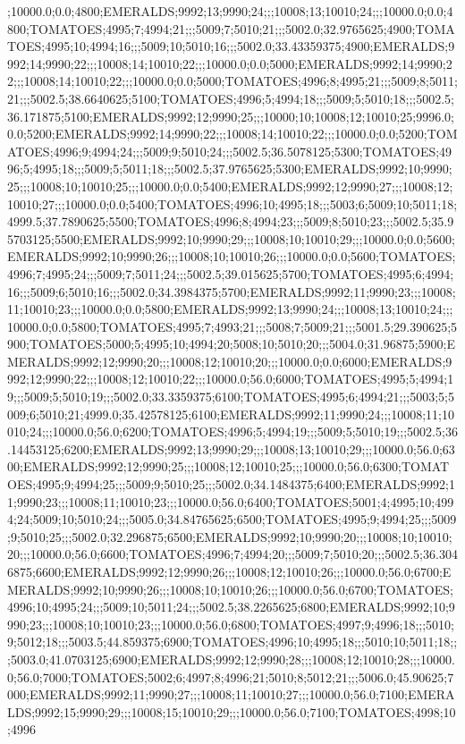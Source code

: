 ;10000.0;0.0;4800;EMERALDS;9992;13;9990;24;;;10008;13;10010;24;;;10000.0;0.0;4800;TOMATOES;4995;7;4994;21;;;5009;7;5010;21;;;5002.0;32.9765625;4900;TOMATOES;4995;10;4994;16;;;5009;10;5010;16;;;5002.0;33.43359375;4900;EMERALDS;9992;14;9990;22;;;10008;14;10010;22;;;10000.0;0.0;5000;EMERALDS;9992;14;9990;22;;;10008;14;10010;22;;;10000.0;0.0;5000;TOMATOES;4996;8;4995;21;;;5009;8;5011;21;;;5002.5;38.6640625;5100;TOMATOES;4996;5;4994;18;;;5009;5;5010;18;;;5002.5;36.171875;5100;EMERALDS;9992;12;9990;25;;;10000;10;10008;12;10010;25;9996.0;0.0;5200;EMERALDS;9992;14;9990;22;;;10008;14;10010;22;;;10000.0;0.0;5200;TOMATOES;4996;9;4994;24;;;5009;9;5010;24;;;5002.5;36.5078125;5300;TOMATOES;4996;5;4995;18;;;5009;5;5011;18;;;5002.5;37.9765625;5300;EMERALDS;9992;10;9990;25;;;10008;10;10010;25;;;10000.0;0.0;5400;EMERALDS;9992;12;9990;27;;;10008;12;10010;27;;;10000.0;0.0;5400;TOMATOES;4996;10;4995;18;;;5003;6;5009;10;5011;18;4999.5;37.7890625;5500;TOMATOES;4996;8;4994;23;;;5009;8;5010;23;;;5002.5;35.95703125;5500;EMERALDS;9992;10;9990;29;;;10008;10;10010;29;;;10000.0;0.0;5600;EMERALDS;9992;10;9990;26;;;10008;10;10010;26;;;10000.0;0.0;5600;TOMATOES;4996;7;4995;24;;;5009;7;5011;24;;;5002.5;39.015625;5700;TOMATOES;4995;6;4994;16;;;5009;6;5010;16;;;5002.0;34.3984375;5700;EMERALDS;9992;11;9990;23;;;10008;11;10010;23;;;10000.0;0.0;5800;EMERALDS;9992;13;9990;24;;;10008;13;10010;24;;;10000.0;0.0;5800;TOMATOES;4995;7;4993;21;;;5008;7;5009;21;;;5001.5;29.390625;5900;TOMATOES;5000;5;4995;10;4994;20;5008;10;5010;20;;;5004.0;31.96875;5900;EMERALDS;9992;12;9990;20;;;10008;12;10010;20;;;10000.0;0.0;6000;EMERALDS;9992;12;9990;22;;;10008;12;10010;22;;;10000.0;56.0;6000;TOMATOES;4995;5;4994;19;;;5009;5;5010;19;;;5002.0;33.3359375;6100;TOMATOES;4995;6;4994;21;;;5003;5;5009;6;5010;21;4999.0;35.42578125;6100;EMERALDS;9992;11;9990;24;;;10008;11;10010;24;;;10000.0;56.0;6200;TOMATOES;4996;5;4994;19;;;5009;5;5010;19;;;5002.5;36.14453125;6200;EMERALDS;9992;13;9990;29;;;10008;13;10010;29;;;10000.0;56.0;6300;EMERALDS;9992;12;9990;25;;;10008;12;10010;25;;;10000.0;56.0;6300;TOMATOES;4995;9;4994;25;;;5009;9;5010;25;;;5002.0;34.1484375;6400;EMERALDS;9992;11;9990;23;;;10008;11;10010;23;;;10000.0;56.0;6400;TOMATOES;5001;4;4995;10;4994;24;5009;10;5010;24;;;5005.0;34.84765625;6500;TOMATOES;4995;9;4994;25;;;5009;9;5010;25;;;5002.0;32.296875;6500;EMERALDS;9992;10;9990;20;;;10008;10;10010;20;;;10000.0;56.0;6600;TOMATOES;4996;7;4994;20;;;5009;7;5010;20;;;5002.5;36.3046875;6600;EMERALDS;9992;12;9990;26;;;10008;12;10010;26;;;10000.0;56.0;6700;EMERALDS;9992;10;9990;26;;;10008;10;10010;26;;;10000.0;56.0;6700;TOMATOES;4996;10;4995;24;;;5009;10;5011;24;;;5002.5;38.2265625;6800;EMERALDS;9992;10;9990;23;;;10008;10;10010;23;;;10000.0;56.0;6800;TOMATOES;4997;9;4996;18;;;5010;9;5012;18;;;5003.5;44.859375;6900;TOMATOES;4996;10;4995;18;;;5010;10;5011;18;;;5003.0;41.0703125;6900;EMERALDS;9992;12;9990;28;;;10008;12;10010;28;;;10000.0;56.0;7000;TOMATOES;5002;6;4997;8;4996;21;5010;8;5012;21;;;5006.0;45.90625;7000;EMERALDS;9992;11;9990;27;;;10008;11;10010;27;;;10000.0;56.0;7100;EMERALDS;9992;15;9990;29;;;10008;15;10010;29;;;10000.0;56.0;7100;TOMATOES;4998;10;4996